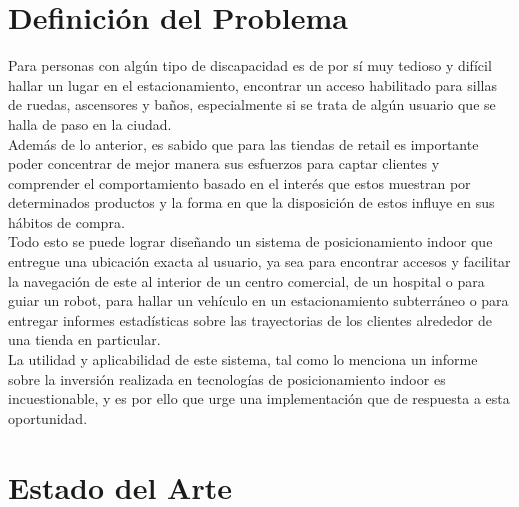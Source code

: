 \section{Definición del Problema}


Para personas con algún tipo de discapacidad es de por sí muy tedioso y difícil hallar un lugar en el estacionamiento, encontrar un acceso habilitado para sillas de ruedas, ascensores y baños, especialmente si se trata de algún usuario que se halla de paso en la ciudad.\\

Además de lo anterior, es sabido que para las tiendas de retail es importante poder concentrar de mejor manera sus esfuerzos para captar clientes y comprender el comportamiento basado en el interés que estos muestran por determinados productos y la forma en que la disposición de estos influye en sus hábitos de compra.\\

Todo esto se puede lograr diseñando un sistema de posicionamiento indoor que entregue una ubicación exacta al usuario, ya sea para encontrar accesos y facilitar la navegación de este al interior de un centro comercial, de un hospital o para guiar un robot, para hallar un vehículo en un estacionamiento subterráneo o para entregar informes estadísticas sobre las trayectorias de los clientes alrededor de una tienda en particular.\\

La utilidad y aplicabilidad de este sistema, tal como lo menciona un informe  sobre la inversión\cite{15} realizada en tecnologías de posicionamiento indoor es incuestionable, y es por ello que urge una implementación que de respuesta a esta oportunidad.


\section{Estado del Arte}

